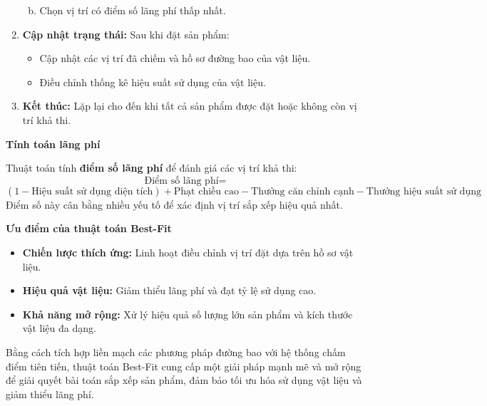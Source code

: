 \begin{enumerate}[1) ]
\begin{enumerate}[a)]
\begin{itemize}
        \end{itemize}
        \item Chọn vị trí có điểm số lãng phí thấp nhất.
    \end{enumerate}
    \item \textbf{Cập nhật trạng thái:} Sau khi đặt sản phẩm:
    \begin{itemize}
        \item Cập nhật các vị trí đã chiếm và hồ sơ đường bao của vật liệu.
        \item Điều chỉnh thống kê hiệu suất sử dụng của vật liệu.
    \end{itemize}
    \item \textbf{Kết thúc:} Lặp lại cho đến khi tất cả sản phẩm được đặt hoặc không còn vị trí khả thi.
\end{enumerate}

\vspace{0.3cm}
\noindent\textbf{Tính toán lãng phí}

Thuật toán tính \textbf{điểm số lãng phí} để đánh giá các vị trí khả thi:
\[
\text{Điểm số lãng phí} = 
\]
\[
(1 - \text{Hiệu suất sử dụng diện tích}) + \text{Phạt chiều cao} - \text{Thưởng căn chỉnh cạnh} - \text{Thưởng hiệu suất sử dụng}
\]
Điểm số này cân bằng nhiều yếu tố để xác định vị trí sắp xếp hiệu quả nhất.

\vspace{0.3cm}
\noindent\textbf{Ưu điểm của thuật toán Best-Fit}
\begin{itemize}
    \item \textbf{Chiến lược thích ứng:} Linh hoạt điều chỉnh vị trí đặt dựa trên hồ sơ vật liệu.
    \item \textbf{Hiệu quả vật liệu:} Giảm thiểu lãng phí và đạt tỷ lệ sử dụng cao.
    \item \textbf{Khả năng mở rộng:} Xử lý hiệu quả số lượng lớn sản phẩm và kích thước vật liệu đa dạng.
\end{itemize}

Bằng cách tích hợp liền mạch các phương pháp đường bao với hệ thống chấm điểm tiên tiến, thuật toán Best-Fit cung cấp một giải pháp mạnh mẽ và mở rộng để giải quyết bài toán sắp xếp sản phẩm, đảm bảo tối ưu hóa sử dụng vật liệu và giảm thiểu lãng phí.